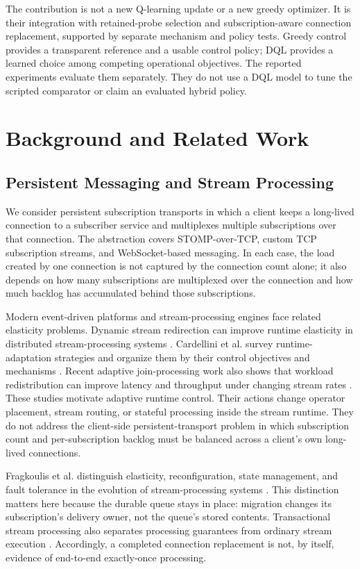 \documentclass[manuscript,nonacm]{acmart}
\begin{document}
The contribution is not a new Q-learning update or a new greedy optimizer.
It is their integration with retained-probe selection and subscription-aware
connection replacement, supported by separate mechanism and policy tests.
Greedy control provides a transparent reference and a usable control policy;
DQL provides a learned choice among competing operational objectives. The
reported experiments evaluate them separately. They do not use a DQL model
to tune the scripted comparator or claim an evaluated hybrid policy.

\section{Background and Related Work}

\subsection{Persistent Messaging and Stream Processing}

We consider persistent subscription transports in which a client keeps a
long-lived connection to a subscriber service and multiplexes multiple
subscriptions over that connection. The abstraction covers STOMP-over-TCP,
custom TCP subscription streams, and WebSocket-based messaging. In each case,
the load created by one connection is not captured by the connection count
alone; it also depends on how many subscriptions are multiplexed over the
connection and how much backlog has accumulated behind those subscriptions.

Modern event-driven platforms and stream-processing engines face related
elasticity problems. Dynamic stream redirection can improve runtime elasticity
in distributed stream-processing systems \cite{Liu2020DrStream}. Cardellini
et al. survey runtime-adaptation strategies and organize them by their control
objectives and mechanisms \cite{Cardellini2022DSPAdaptation}. Recent adaptive
join-processing work also shows that workload redistribution can improve
latency and throughput under changing stream rates \cite{Sun2024AjStream}.
These studies motivate adaptive runtime control. Their actions change
operator placement, stream routing, or stateful processing inside the stream
runtime. They do not address the client-side persistent-transport problem in
which subscription count and per-subscription backlog must be balanced across a
client's own long-lived connections.

Fragkoulis et al. distinguish elasticity, reconfiguration, state management,
and fault tolerance in the evolution of stream-processing systems
\cite{Fragkoulis2024StreamEvolution}. This distinction matters here because
the durable queue stays in place: migration changes its subscription's delivery
owner, not the queue's stored contents. Transactional stream processing also
separates processing guarantees from ordinary stream execution
\cite{Zhang2024TransactionalStreams}. Accordingly, a completed connection
replacement is not, by itself, evidence of end-to-end exactly-once processing.
\end{document}
